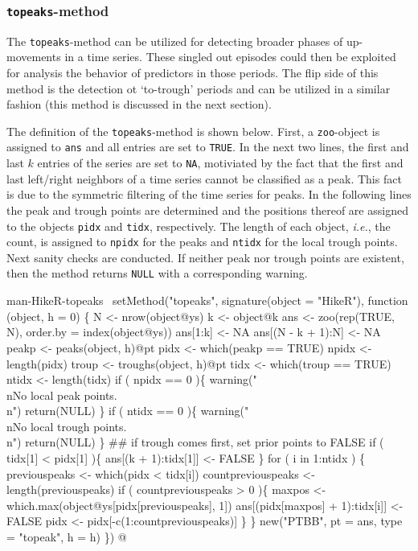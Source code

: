 \documentclass[a4paper]{article}
\begin{document}
\subsubsection{\texttt{topeaks}-method}
The \verb?topeaks?-method can be utilized for detecting broader phases of
up-movements in a time series. These singled out episodes could then
be exploited for analysis the behavior of predictors in those
periods. The flip side of this method is the detection ot `to-trough'
periods and can be utilized in a similar fashion (this method is
discussed in the next section).\par
The definition of the \verb?topeaks?-method is shown below. First, a
\verb?zoo?-object is assigned to \verb?ans? and all entries are set to
\verb?TRUE?. In the next two lines, the first and last $k$ entries of the
series are set to \verb?NA?, motiviated by the fact that the first and
last left/right neighbors of a time series cannot be classified as a
peak. This fact is due to the symmetric filtering of the time series
for peaks. In the following lines the peak and trough points are
determined and the positions thereof are assigned to the objects
\verb?pidx? and \verb?tidx?, respectively. The length of each object,
\emph{i.e.}, the count, is assigned to \verb?npidx? for the peaks and
\verb?ntidx? for the local trough points. Next sanity checks are
conducted. If neither peak nor trough points are existent, then the
method returns \verb?NULL? with a corresponding warning.

\nwenddocs{}\endmoddef
\LA{}man-HikeR-topeaks~{\nwtagstyle{}}\RA{}
setMethod("topeaks",
    signature(object = "HikeR"),
    function (object, h = 0) \{
        N <- nrow(object@ys)
        k <- object@k
        ans <- zoo(rep(TRUE, N), order.by = index(object@ys))
        ans[1:k] <- NA
        ans[(N - k + 1):N] <- NA
        peakp <- peaks(object, h)@pt
        pidx <- which(peakp == TRUE)
        npidx <- length(pidx)
        troup <- troughs(object, h)@pt
        tidx <- which(troup == TRUE)
        ntidx <- length(tidx)
        if ( npidx == 0 )\{
            warning("\\nNo local peak points.\\n")
            return(NULL)
        \}
        if ( ntidx == 0 )\{
            warning("\\nNo local trough points.\\n")
            return(NULL)
        \}
        ## if trough comes first, set prior points to FALSE
        if ( tidx[1] < pidx[1] )\{
            ans[(k + 1):tidx[1]] <- FALSE
        \}
        for ( i in 1:ntidx ) \{
            previouspeaks <- which(pidx < tidx[i])
            countpreviouspeaks <- length(previouspeaks)
            if ( countpreviouspeaks > 0 )\{
                maxpos <- which.max(object@ys[pidx[previouspeaks], 1])
                ans[(pidx[maxpos] + 1):tidx[i]] <- FALSE
                pidx <- pidx[-c(1:countpreviouspeaks)]
            \}
        \}
        new("PTBB", pt = ans, type = "topeak", h = h)
\})
\nwendcode{}@
\end{document}

